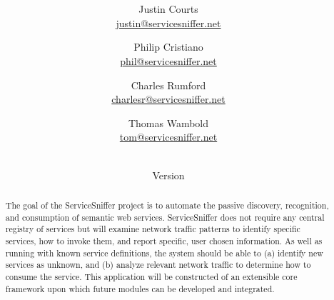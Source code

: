 \documentclass[titlepage]{article}
\title{\textbf{\mytitle}}
\author{
    Justin Courts \\\url{justin@servicesniffer.net}
    \and Philip Cristiano \\\url{phil@servicesniffer.net}
    \and Charles Rumford \\\url{charlesr@servicesniffer.net}
    \and Thomas Wambold \\\url{tom@servicesniffer.net}
}
\date{\mydate\\Version \myversion}
\begin{document}


\maketitle

\begin{abstract}
The goal of the ServiceSniffer project is to automate the passive discovery,
recognition, and consumption of semantic web services.  ServiceSniffer does not
require any central registry of services but will examine network traffic
patterns to identify specific services, how to invoke them, and report
specific, user chosen information.  As well as running with known service
definitions, the system should be able to (a) identify new services as unknown,
and (b) analyze relevant network traffic to determine how to consume the
service.  This application will be constructed of an extensible core framework
upon which future modules can be developed and integrated.
\end{abstract}

\setcounter{tocdepth}{4}
\tableofcontents
\pagebreak
\listoffigures
\pagebreak
{}


%
%
%

\end{document}
